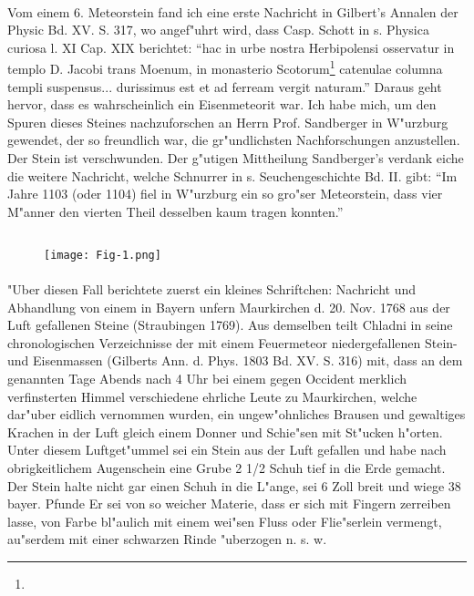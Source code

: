 \documentclass[a4paper, 11pt, oneside]{article}
\begin{document}
\paragraph{}
Vom einem 6. Meteorstein fand ich eine erste Nachricht in Gilbert's Annalen der Physic Bd. XV. S. 317, wo angef"uhrt wird, dass Casp. Schott in s. Physica curiosa l. XI Cap. XIX berichtet: "`hac in urbe nostra Herbipolensi osservatur in templo D. Jacobi trans Moenum, in monasterio Scotorum\footnote{} catenulae columna templi suspensus... durissimus est et ad ferream vergit naturam."' Daraus geht hervor, dass es wahrscheinlich ein Eisenmeteorit war. Ich habe mich, um den Spuren dieses Steines nachzuforschen an Herrn Prof. Sandberger in W"urzburg gewendet, der so freundlich war, die gr"undlichsten Nachforschungen anzustellen. Der Stein ist verschwunden. Der g"utigen Mittheilung Sandberger's verdank eiche die weitere Nachricht, welche Schnurrer in s. Seuchengeschichte Bd. II. gibt: "`Im Jahre 1103 (oder 1104) fiel in W"urzburg ein so gro"ser Meteorstein, dass vier M"anner den vierten Theil desselben kaum tragen konnten."'
\clearpage
\subsection{}
\begin{figure}[h]
\centering
\texttt{[image: Fig-1.png]}
\caption{}
\end{figure}
\paragraph{}
"Uber diesen Fall berichtete zuerst ein kleines Schriftchen: Nachricht und Abhandlung von einem in Bayern unfern Maurkirchen d. 20. Nov. 1768 aus der Luft gefallenen Steine (Straubingen 1769). Aus demselben teilt Chladni in seine chronologischen Verzeichnisse der mit einem Feuermeteor niedergefallenen Stein- und Eisenmassen (Gilberts Ann. d. Phys. 1803 Bd. XV. S. 316) mit, dass an dem genannten Tage Abends nach 4 Uhr bei einem gegen Occident merklich verfinsterten Himmel verschiedene ehrliche Leute zu Maurkirchen, welche dar"uber eidlich vernommen wurden, ein ungew"ohnliches Brausen und gewaltiges Krachen in der Luft gleich einem Donner und Schie"sen mit St"ucken h"orten. Unter diesem Luftget"ummel sei ein Stein aus der Luft gefallen und habe nach obrigkeitlichem Augenschein eine Grube 2 1/2 Schuh tief in die Erde gemacht. Der Stein halte nicht gar einen Schuh in die L"ange, sei 6 Zoll breit und wiege 38 bayer. Pfunde Er sei von so weicher Materie, dass er sich mit Fingern zerreiben lasse, von Farbe bl"aulich mit einem wei"sen Fluss oder Flie"serlein vermengt, au"serdem mit einer schwarzen Rinde "uberzogen n. s. w.
\end{document}
